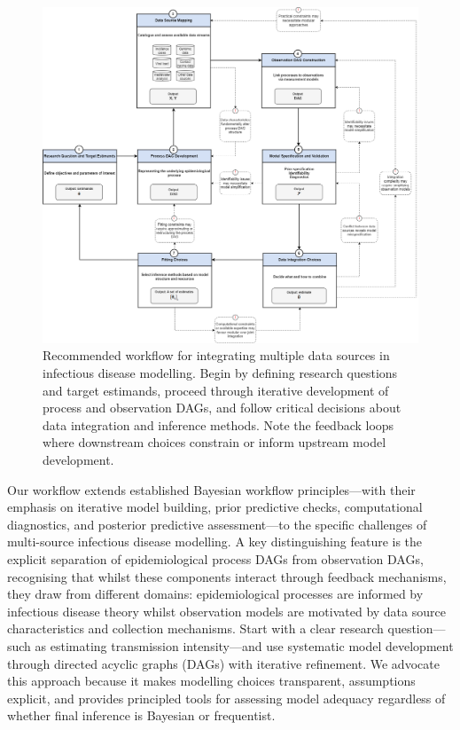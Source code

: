 \documentclass{article}
\begin{document}
\begin{figure}[htbp]
    \centering
    \includegraphics[width=\textwidth]{figures/visualization of core steps.drawio.png}
    \caption{Recommended workflow for integrating multiple data sources in infectious disease modelling. Begin by defining research questions and target estimands, proceed through iterative development of process and observation DAGs, and follow critical decisions about data integration and inference methods. Note the feedback loops where downstream choices constrain or inform upstream model development.}
    \label{fig:workflow}
\end{figure}

Our workflow extends established Bayesian workflow principles—with their emphasis on iterative model building, prior predictive checks, computational diagnostics, and posterior predictive assessment—to the specific challenges of multi-source infectious disease modelling.
A key distinguishing feature is the explicit separation of epidemiological process DAGs from observation DAGs, recognising that whilst these components interact through feedback mechanisms, they draw from different domains: epidemiological processes are informed by infectious disease theory whilst observation models are motivated by data source characteristics and collection mechanisms.
Start with a clear research question—such as estimating transmission intensity—and use systematic model development through directed acyclic graphs (DAGs) with iterative refinement.
We advocate this approach because it makes modelling choices transparent, assumptions explicit, and provides principled tools for assessing model adequacy regardless of whether final inference is Bayesian or frequentist.
\end{document}

